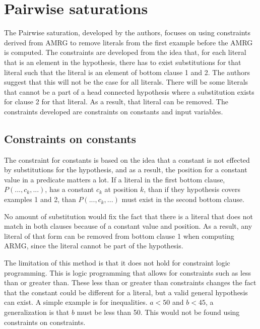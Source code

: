 \documentclass[jair,twoside,11pt,theapa]{article}
\begin{document}
\section{Pairwise saturations}
The Pairwise saturation, developed by the authors, focuses on using constraints derived from AMRG to remove literals from the first example before the AMRG is computed. The constraints are developed from the idea that, for each literal that is an element in the hypothesis, there has to exist substitutions for that literal such that the literal is an element of bottom clause 1 and 2. 
The authors suggest that this will not be the case for all literals. There will be some literals that cannot be a part of a head connected hypothesis where a substitution exists for clause 2 for that literal. As a result, that literal can be removed. The constraints developed are constraints on constants and input variables. 

\subsection{Constraints on constants}
The constraint for constants is based on the idea that a constant is not effected by substitutions for the hypothesis, and as a result, the position for a constant value in a predicate matters a lot. If a literal in the first bottom clause, $P(...,c_k,...)$, has a constant $c_k$ at position $k$, than if they hypothesis covers examples 1 and 2, than $P(...,c_k,...)$ must exist in the second bottom clause. 

No amount of substitution would fix the fact that there is a literal that does not match in both clauses because of a constant value and position. As a result, any literal of that form can be removed from bottom clause 1 when computing ARMG, since the literal cannot be part of the hypothesis. 

The limitation of this method is that it does not hold for constraint logic programming. This is logic programming that allows for constraints such as less than or greater than. These less than or greater than constraints changes the fact that the constant could be different for a literal, but a valid general hypothesis can exist. A simple example is for inequalities. $a < 50$ and $b < 45$, a generalization is that $b$ must be less than 50. This would not be found using constraints on constraints. 
\end{document}
